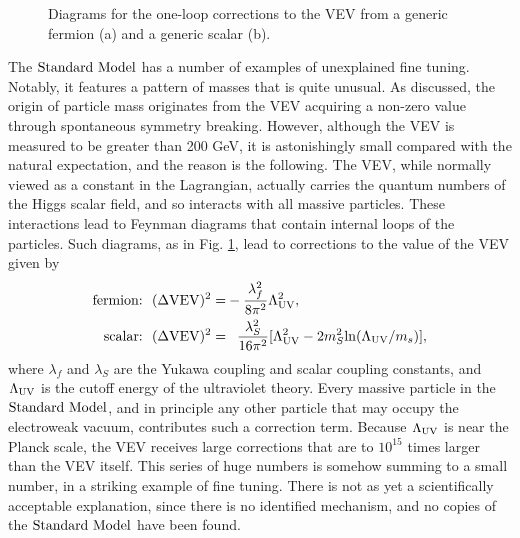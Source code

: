 \begin{figure}[h]
\caption{Diagrams for the one-loop corrections to the VEV from a generic fermion (a) and a generic scalar (b).} 
\label{fig:VevLoops}
\end{figure}
The $\text{Standard\ Model}$ has a number of examples of unexplained fine tuning. Notably, it features a pattern of masses that is quite unusual. As discussed, the origin of particle mass originates from the VEV acquiring a non-zero value through spontaneous symmetry breaking. However, although the VEV is measured to be greater than 200 GeV, it is astonishingly small compared with the natural expectation, and the reason is the following.  The VEV, while normally viewed as a constant in the Lagrangian, actually carries the quantum numbers of the Higgs scalar field, and so interacts with all massive particles. These interactions lead to Feynman diagrams that contain internal loops of the particles. Such diagrams, as in Fig. \ref{fig:VevLoops}, lead to corrections to the value of the VEV given by
\begin{align}
{\rm fermion\hspace{-.1cm}:\ \ }(\Delta {\rm VEV})^2 =& -\frac{\lambda_f^2}{8\pi^2}\cutoff^{2},\label{eq:FermLoop}\\
{\rm scalar\hspace{-.1cm}:\ \ }(\Delta {\rm VEV})^2 =& \hphantom{-} \frac{\lambda_{S}^2}{16\pi^2}[\cutoff^{2}-2m_{S}^2{\rm ln}(\cutoff / m_s)],
\label{eq:ScalarLoop}
\end{align}
where $\lambda_f$ and $\lambda_S$ are the Yukawa coupling and scalar coupling constants, and $\Lambda_{\rm UV}$ is the cutoff energy of the ultraviolet theory. Every massive particle in the $\text{Standard\ Model}$, and in principle any other particle that may occupy the electroweak vacuum, contributes such a correction term. Because $\Lambda_{\rm UV}$ is near the Planck scale, the VEV receives large corrections that are to $10^{15}$ times larger than the VEV itself. This series of huge numbers is somehow summing to a small number, in a striking example of fine tuning. There is not as yet a scientifically acceptable explanation, since there is no identified mechanism, and no copies of the $\text{Standard\ Model}$ have been found.

